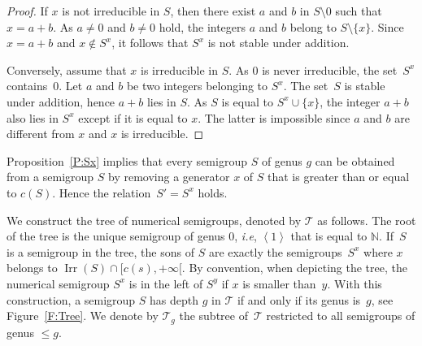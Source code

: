 \documentclass[reqno]{amsart}
\theoremstyle{plain}
\theoremstyle{definition}
\newcommand{\ie}{\emph{i.e.}}
\renewcommand{\leq}{\leqslant}
\newcommand{\NN}{\mathbb{N}}
\renewcommand{\ie}{\emph{i.e}}
\DeclareMathOperator{\Irr}{Irr}
\begin{document}
\begin{proof}
If $x$ is not irreducible in  $S$, then there exist $a$ and $b$ in $S\setminus{0}$ such that $x=a+b$. 
As $a\not=0$ and $b\not=0$ hold, the integers  $a$ and $b$ belong to $S\setminus\{x\}$. 
Since $x=a+b$ and $x\not\in S^x$, it follows that  $S^x$ is not stable under addition. 

Conversely, assume that $x$ is irreducible in  $S$. 
As $0$ is never irreducible, the set~$S^x$ contains~$0$. 
Let $a$ and $b$ be two integers belonging to $S^x$. 
The set~$S$ is stable under addition, hence $a+b$ lies in $S$. 
As $S$ is equal to $S^x\cup\{x\}$, the integer $a+b$ also lies in $S^x$ except if it is equal to $x$. 
The latter is impossible since $a$ and $b$ are different from $x$ and $x$ is irreducible.
\end{proof}

Proposition~\ref{P:Sx} implies that every semigroup $S$ of genus $g$ can be obtained from a semigroup $S$ by removing a generator $x$ of $S$ that is greater than or equal to $c(S)$.
Hence the relation~$S'=S^x$ holds.

We construct the tree of numerical semigroups, denoted by $\mathcal{T}$ as follows. 
The root of the tree is the unique semigroup of genus $0$, \ie, $\left<1\right>$ that is equal to $\NN$. 
If~$S$ is a semigroup in the tree,  the sons of $S$ are exactly the semigroups~$S^x$ where $x$ belongs to $\Irr(S)\cap[c(s),+\infty[$. 
By convention, when depicting the tree, the numerical semigroup $S^x$ is in the left of $S^y$ if $x$ is smaller than~$y$. 
With this construction, a semigroup $S$ has depth $g$ in $\mathcal{T}$ if and only if its genus is~$g$, see Figure~\ref{F:Tree}.
We denote by $\mathcal{T}_{g}$ the subtree of~$\mathcal{T}$ restricted to all semigroups of genus $\leq g$.
\end{document}
